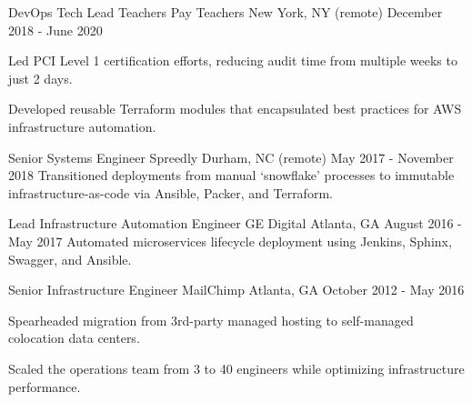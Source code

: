 \begin{cventries}
  \cventry
    {DevOps Tech Lead} %
    {Teachers Pay Teachers} %
    {New York, NY (remote)} %
    {December 2018 - June 2020} %
    {
      \begin{cvitems} %
        \item {Led PCI Level 1 certification efforts, reducing audit time from multiple weeks to just 2 days.}
        \item {Developed reusable Terraform modules that encapsulated best practices for AWS infrastructure automation.}
      \end{cvitems}
    }

  \cventry
    {Senior Systems Engineer} %
    {Spreedly} %
    {Durham, NC (remote)} %
    {May 2017 - November 2018} %
    {Transitioned deployments  from manual `snowflake' processes to immutable infrastructure-as-code via Ansible, Packer, and Terraform.}

  \cventry
    {Lead Infrastructure Automation Engineer} %
    {GE Digital} %
    {Atlanta, GA} %
    {August 2016 - May 2017} %
    {Automated microservices lifecycle deployment using Jenkins, Sphinx, Swagger, and Ansible.}

  \cventry
    {Senior Infrastructure Engineer} %
    {MailChimp} %
    {Atlanta, GA} %
    {October 2012 - May 2016} %
    {
      \begin{cvitems}
        \item {Spearheaded migration from 3rd-party managed hosting to self-managed colocation data centers.}
        \item {Scaled the operations team from 3 to 40 engineers while optimizing infrastructure performance.}
      \end{cvitems}
    }
 



\end{cventries}
